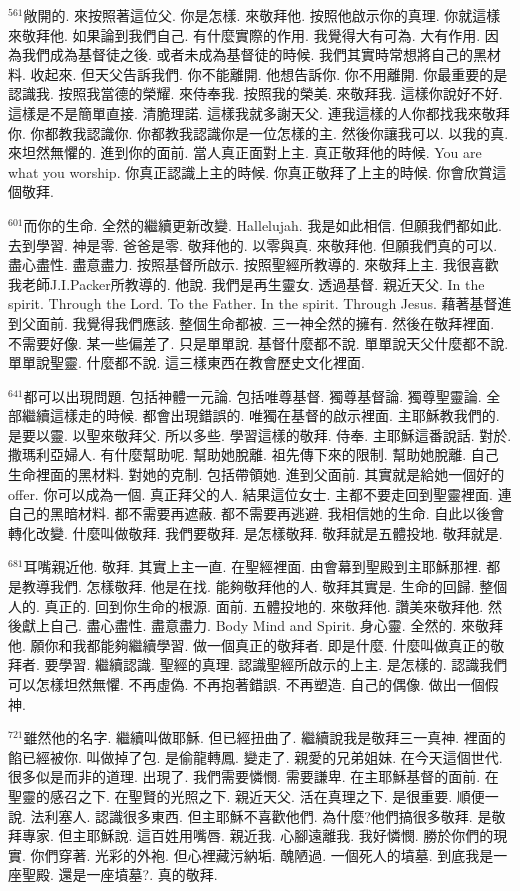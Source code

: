 \documentclass{book}
\begin{document}
$^{561}$敞開的.
來按照著這位父.
你是怎樣.
來敬拜他.
按照他啟示你的真理.
你就這樣來敬拜他.
如果論到我們自己.
有什麼實際的作用.
我覺得大有可為.
大有作用.
因為我們成為基督徒之後.
或者未成為基督徒的時候.
我們其實時常想將自己的黑材料.
收起來.
但天父告訴我們.
你不能離開.
他想告訴你.
你不用離開.
你最重要的是認識我.
按照我當德的榮耀.
來侍奉我.
按照我的榮美.
來敬拜我.
這樣你說好不好.
這樣是不是簡單直接.
清脆理諾.
這樣我就多謝天父.
連我這樣的人你都找我來敬拜你.
你都教我認識你.
你都教我認識你是一位怎樣的主.
然後你讓我可以.
以我的真.
來坦然無懼的.
進到你的面前.
當人真正面對上主.
真正敬拜他的時候.
You are what you worship.
你真正認識上主的時候.
你真正敬拜了上主的時候.
你會欣賞這個敬拜.

$^{601}$而你的生命.
全然的繼續更新改變.
Hallelujah.
我是如此相信.
但願我們都如此.
去到學習.
神是零.
爸爸是零.
敬拜他的.
以零與真.
來敬拜他.
但願我們真的可以.
盡心盡性.
盡意盡力.
按照基督所啟示.
按照聖經所教導的.
來敬拜上主.
我很喜歡我老師J.I.Packer所教導的.
他說.
我們是再生靈女.
透過基督.
親近天父.
In the spirit.
Through the Lord.
To the Father.
In the spirit.
Through Jesus.
藉著基督進到父面前.
我覺得我們應該.
整個生命都被.
三一神全然的擁有.
然後在敬拜裡面.
不需要好像.
某一些偏差了.
只是單單說.
基督什麼都不說.
單單說天父什麼都不說.
單單說聖靈.
什麼都不說.
這三樣東西在教會歷史文化裡面.

$^{641}$都可以出現問題.
包括神體一元論.
包括唯尊基督.
獨尊基督論.
獨尊聖靈論.
全部繼續這樣走的時候.
都會出現錯誤的.
唯獨在基督的啟示裡面.
主耶穌教我們的.
是要以靈.
以聖來敬拜父.
所以多些.
學習這樣的敬拜.
侍奉.
主耶穌這番說話.
對於.
撒瑪利亞婦人.
有什麼幫助呢.
幫助她脫離.
祖先傳下來的限制.
幫助她脫離.
自己生命裡面的黑材料.
對她的克制.
包括帶領她.
進到父面前.
其實就是給她一個好的offer.
你可以成為一個.
真正拜父的人.
結果這位女士.
主都不要走回到聖靈裡面.
連自己的黑暗材料.
都不需要再遮蔽.
都不需要再逃避.
我相信她的生命.
自此以後會轉化改變.
什麼叫做敬拜.
我們要敬拜.
是怎樣敬拜.
敬拜就是五體投地.
敬拜就是.

$^{681}$耳嘴親近他.
敬拜.
其實上主一直.
在聖經裡面.
由會幕到聖殿到主耶穌那裡.
都是教導我們.
怎樣敬拜.
他是在找.
能夠敬拜他的人.
敬拜其實是.
生命的回歸.
整個人的.
真正的.
回到你生命的根源.
面前.
五體投地的.
來敬拜他.
讚美來敬拜他.
然後獻上自己.
盡心盡性.
盡意盡力.
Body Mind and Spirit.
身心靈.
全然的.
來敬拜他.
願你和我都能夠繼續學習.
做一個真正的敬拜者.
即是什麼.
什麼叫做真正的敬拜者.
要學習.
繼續認識.
聖經的真理.
認識聖經所啟示的上主.
是怎樣的.
認識我們可以怎樣坦然無懼.
不再虛偽.
不再抱著錯誤.
不再塑造.
自己的偶像.
做出一個假神.

$^{721}$雖然他的名字.
繼續叫做耶穌.
但已經扭曲了.
繼續說我是敬拜三一真神.
裡面的餡已經被你.
叫做掉了包.
是偷龍轉鳳.
變走了.
親愛的兄弟姐妹.
在今天這個世代.
很多似是而非的道理.
出現了.
我們需要憐憫.
需要謙卑.
在主耶穌基督的面前.
在聖靈的感召之下.
在聖賢的光照之下.
親近天父.
活在真理之下.
是很重要.
順便一說.
法利塞人.
認識很多東西.
但主耶穌不喜歡他們.
為什麼?他們搞很多敬拜.
是敬拜專家.
但主耶穌說.
這百姓用嘴唇.
親近我.
心腳遠離我.
我好憐憫.
勝於你們的現實.
你們穿著.
光彩的外袍.
但心裡藏污納垢.
醜陋過.
一個死人的墳墓.
到底我是一座聖殿.
還是一座墳墓?.
真的敬拜.
\end{document}
